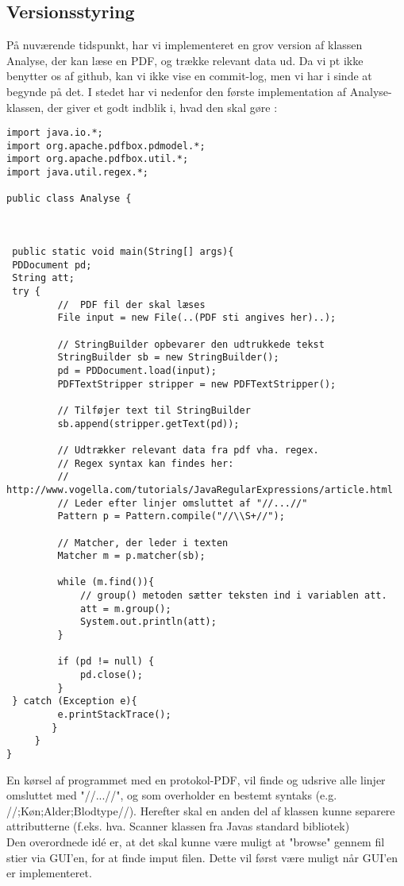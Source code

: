 \documentclass[11pt]{article}
\begin{document}
\subsection{Versionsstyring}
På nuværende tidspunkt, har vi implementeret en grov version af klassen Analyse, der kan læse en PDF, og trække relevant data ud. 
Da vi pt ikke benytter os af github, kan vi ikke vise en commit-log, men vi har i sinde at begynde på det. I stedet har vi nedenfor den første implementation af Analyse-klassen, der giver et godt indblik i, hvad den skal gøre :
\begin{verbatim}
import java.io.*;
import org.apache.pdfbox.pdmodel.*;
import org.apache.pdfbox.util.*;
import java.util.regex.*;

public class Analyse {
   
    
   
 public static void main(String[] args){
 PDDocument pd;
 String att;
 try { 
         //  PDF fil der skal læses
         File input = new File(..(PDF sti angives her)..); 

         // StringBuilder opbevarer den udtrukkede tekst
         StringBuilder sb = new StringBuilder();
         pd = PDDocument.load(input);
         PDFTextStripper stripper = new PDFTextStripper();

         // Tilføjer text til StringBuilder
         sb.append(stripper.getText(pd));

         // Udtrækker relevant data fra pdf vha. regex.
         // Regex syntax kan findes her:
         // http://www.vogella.com/tutorials/JavaRegularExpressions/article.html
         // Leder efter linjer omsluttet af "//...//"
         Pattern p = Pattern.compile("//\\S+//");

         // Matcher, der leder i texten
         Matcher m = p.matcher(sb);

         while (m.find()){
             // group() metoden sætter teksten ind i variablen att.
             att = m.group();
             System.out.println(att);
         }

         if (pd != null) {
             pd.close();
         }
 } catch (Exception e){
         e.printStackTrace();
        }
     }
} 
\end{verbatim}
En kørsel af programmet med en protokol-PDF, vil finde og udsrive alle linjer omsluttet med "//...//", og som overholder en bestemt syntaks (e.g. //;Køn;Alder;Blodtype//). Herefter skal en anden del af klassen kunne separere attributterne (f.eks. hva. Scanner klassen fra Javas standard bibliotek) \\Den overordnede idé er, at det skal kunne være muligt at "browse" gennem fil stier via GUI'en, for at finde imput filen. Dette vil først være muligt når GUI'en er implementeret.
\end{document}

